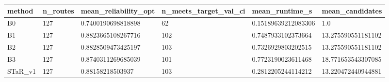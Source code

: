 \begin{tabular}{llllll}
 \hline
 method & n\_routes & mean\_reliability\_opt & n\_meets\_target\_val\_ci & mean\_runtime\_s & mean\_candidates \\
 \hline
 B0 & 127 & 0.7400190698818898 & 62 & 0.15189639212083306 & 1.0 \\
 B1 & 127 & 0.8823665108267716 & 102 & 0.7487933102373664 & 13.275590551181102 \\
 B2 & 127 & 0.8828509473425197 & 103 & 0.7326929803202515 & 13.275590551181102 \\
 B3 & 127 & 0.8740311269685039 & 101 & 0.7723190023611468 & 18.771653543307085 \\
 STaR\_v1 & 127 & 0.88158218503937 & 103 & 0.2812205244114212 & 13.220472440944881 \\
 \hline
\end{tabular}
